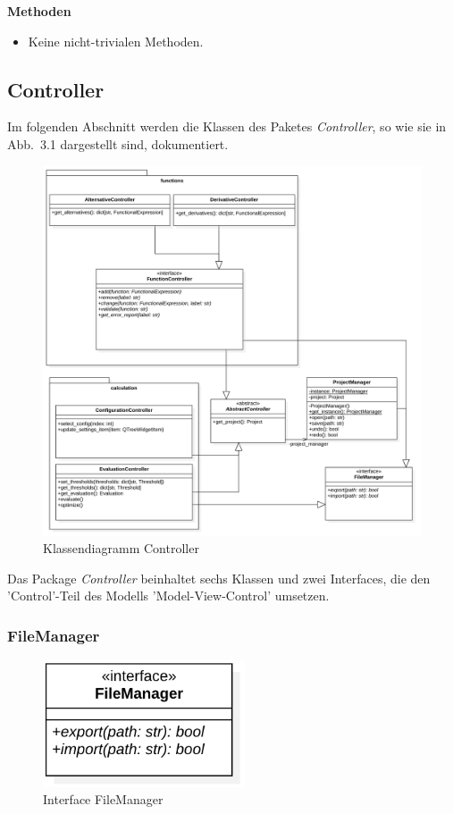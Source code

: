 \documentclass{article}
\begin{document}
\textbf{Methoden}
\begin{itemize}\setlength\itemsep{3em}
\item[] Keine nicht-trivialen Methoden.
\end{itemize}
\newpage
\subsection{Controller}

Im folgenden Abschnitt werden die Klassen des Paketes \emph{Controller}, so wie sie in Abb.~3.1 dargestellt sind, dokumentiert.

\begin{figure}[H]%
    \centering
    \includegraphics[width=13cm]{entwurf/Floriane/ControllerKlassendiagramm.png}
    \caption{Klassendiagramm Controller}
\end{figure}

Das Package \textit{Controller} beinhaltet sechs Klassen und zwei Interfaces, die den 'Control'-Teil des Modells 'Model-View-Control' umsetzen.

\newpage
\subsubsection*{\large{\textbf{FileManager}\label{cls:FileManager}}}\normalsize
\begin{figure}[H]%
    \centering
    \includegraphics[width=6cm]{entwurf/Floriane/FileManager.png}
    \caption{Interface FileManager}
\end{figure}
\end{document}

